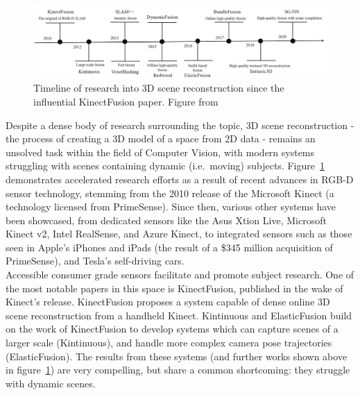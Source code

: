\begin{figure}[t]
	\centering
	\includegraphics[width=\columnwidth]{../images/timeline of research}
	\caption{Timeline of research into 3D scene reconstruction since the influential KinectFusion paper\cite{izadi2011kinectfusion}.
	Figure from\cite{Li:2022aa}}
	\label{fig:timeline}
\end{figure}
Despite a dense body of research surrounding the topic, 3D scene reconstruction - the process of creating a 3D model of a
space from 2D data - remains an unsolved task within the field of Computer Vision, with modern systems struggling with
scenes containing dynamic (i.e.\ moving) subjects.
Figure~\ref{fig:timeline} demonstrates accelerated research efforts as a result of recent advances in RGB-D sensor technology,
stemming from the 2010 release of the Microsoft Kinect (a technology licensed from PrimeSense\cite{zhang2012microsoft}).
Since then, various other systems have been showcased, from dedicated sensors like the Asus Xtion Live, Microsoft Kinect
v2, Intel RealSense, and Azure Kinect, to integrated sensors such as those seen in Apple's iPhones and iPads (the result
of a \$345 million acquisition of PrimeSense\cite{appleprimesense}), and Tesla's self-driving cars.
\\[1ex]
Accessible consumer grade sensors facilitate and promote subject research.
One of the most notable papers in this space is KinectFusion\cite{izadi2011kinectfusion}, published in the wake of Kinect's
release.
KinectFusion proposes a system capable of dense online 3D scene reconstruction from a handheld Kinect.
Kintinuous\cite{kintinuous} and ElasticFusion\cite{elasticfusion} build on the work of KinectFusion to develop systems
which can capture scenes of a larger scale (Kintinuous), and handle more complex camera pose trajectories (ElasticFusion).
The results from these systems (and further works shown above in figure~\ref{fig:timeline}) are very compelling, but share a
common shortcoming: they struggle with dynamic scenes.

